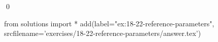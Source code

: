 
\begin{ex}
  \label{ex:18-22-reference-parameters}
  
  \qed
\end{ex}
\begin{python0}
from solutions import *
add(label="ex:18-22-reference-parameters",
    srcfilename='exercises/18-22-reference-parameters/answer.tex')
\end{python0}
